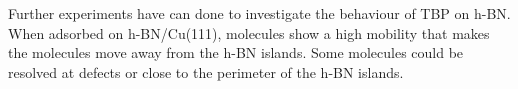 \label{section:TBP}
Further experiments have can done to investigate the behaviour of TBP on h-BN. When adsorbed on h-BN/Cu(111), molecules show a high mobility that makes the molecules move away from the h-BN islands. Some molecules could be resolved at defects or close to the perimeter of the h-BN islands.

